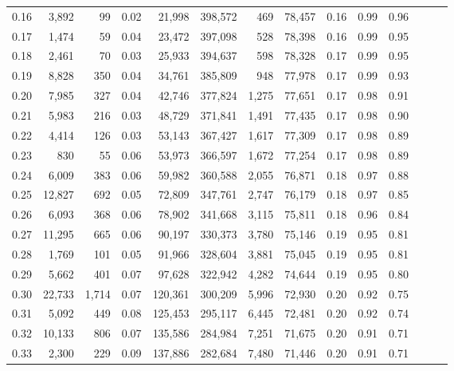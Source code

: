 \begin{tabular}{rrrrrrrrrrrrrr}
0.16 &   3,892 &     99 &  0.02 &   21,998 &  398,572 &     469 &  78,457 &  0.16 &  0.99 &      0.96 \\
0.17 &   1,474 &     59 &  0.04 &   23,472 &  397,098 &     528 &  78,398 &  0.16 &  0.99 &      0.95 \\
0.18 &   2,461 &     70 &  0.03 &   25,933 &  394,637 &     598 &  78,328 &  0.17 &  0.99 &      0.95 \\
0.19 &   8,828 &    350 &  0.04 &   34,761 &  385,809 &     948 &  77,978 &  0.17 &  0.99 &      0.93 \\
0.20 &   7,985 &    327 &  0.04 &   42,746 &  377,824 &   1,275 &  77,651 &  0.17 &  0.98 &      0.91 \\
0.21 &   5,983 &    216 &  0.03 &   48,729 &  371,841 &   1,491 &  77,435 &  0.17 &  0.98 &      0.90 \\
0.22 &   4,414 &    126 &  0.03 &   53,143 &  367,427 &   1,617 &  77,309 &  0.17 &  0.98 &      0.89 \\
0.23 &     830 &     55 &  0.06 &   53,973 &  366,597 &   1,672 &  77,254 &  0.17 &  0.98 &      0.89 \\
0.24 &   6,009 &    383 &  0.06 &   59,982 &  360,588 &   2,055 &  76,871 &  0.18 &  0.97 &      0.88 \\
0.25 &  12,827 &    692 &  0.05 &   72,809 &  347,761 &   2,747 &  76,179 &  0.18 &  0.97 &      0.85 \\
0.26 &   6,093 &    368 &  0.06 &   78,902 &  341,668 &   3,115 &  75,811 &  0.18 &  0.96 &      0.84 \\
0.27 &  11,295 &    665 &  0.06 &   90,197 &  330,373 &   3,780 &  75,146 &  0.19 &  0.95 &      0.81 \\
0.28 &   1,769 &    101 &  0.05 &   91,966 &  328,604 &   3,881 &  75,045 &  0.19 &  0.95 &      0.81 \\
0.29 &   5,662 &    401 &  0.07 &   97,628 &  322,942 &   4,282 &  74,644 &  0.19 &  0.95 &      0.80 \\
0.30 &  22,733 &  1,714 &  0.07 &  120,361 &  300,209 &   5,996 &  72,930 &  0.20 &  0.92 &      0.75 \\
0.31 &   5,092 &    449 &  0.08 &  125,453 &  295,117 &   6,445 &  72,481 &  0.20 &  0.92 &      0.74 \\
0.32 &  10,133 &    806 &  0.07 &  135,586 &  284,984 &   7,251 &  71,675 &  0.20 &  0.91 &      0.71 \\
0.33 &   2,300 &    229 &  0.09 &  137,886 &  282,684 &   7,480 &  71,446 &  0.20 &  0.91 &      0.71 \\

\end{tabular}
